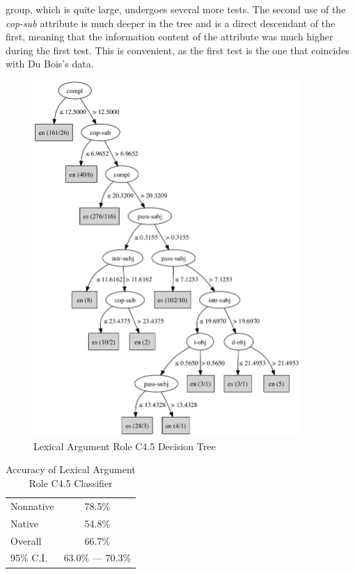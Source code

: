 \documentclass[main.tex]{subfiles}
\begin{document}
group, which is quite large, undergoes several more tests. The second use of the \textit{cop-sub} attribute is much deeper in the tree and is a direct descendant of the first, meaning that the information content of the attribute was much higher during the first test. This is convenient, as the first test is the one that coincides with Du Bois's data. 

\begin{figure}[ht]
\centering
\includegraphics[width=4in]{c45-lex-role.pdf}
\caption{Lexical Argument Role C4.5 Decision Tree}
\label{fig:c4.5-lex-role}
\end{figure}

\begin{table}[ht]
\centering
\caption{Accuracy of Lexical Argument Role C4.5 Classifier}
\begin{tabular}{l c}
\toprule
Nonnative & 78.5\% \\
Native & 54.8\%\\
Overall & 66.7\% \\
95\% C.I. & 63.0\% --- 70.3\%\\
\bottomrule
\end{tabular}
\label{table:lex-role-results}
\end{table}
\end{document}

